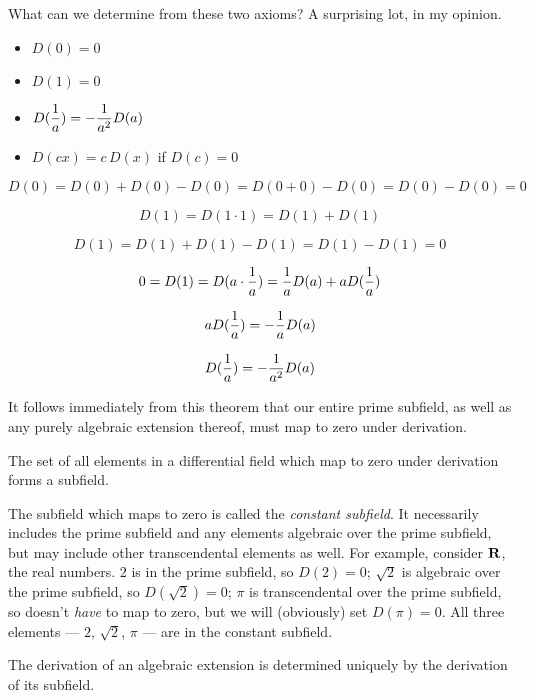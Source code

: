 What can we determine from these two axioms?  A surprising lot,
in my opinion.


\theorem\label{basic difalg}

\begin{itemize}
\item $D(0) = 0$
\item $D(1) = 0$
\item $\displaystyle{D({1\over a}) = - {1\over a^2}D(a)}$
\item $D(cx) = c\, D(x)$ if $D(c)=0$
\end{itemize}

\proof

$$D(0) = D(0) + D(0) - D(0) = D(0+0) - D(0) = D(0) - D(0) = 0$$

$$D(1) = D(1\cdot1) = D(1) + D(1)$$

$$D(1) = D(1) + D(1) - D(1) = D(1) - D(1) = 0$$

$$0 = D(1) = D(a\cdot{1\over a}) = {1\over a} D(a) + a D({1\over a})$$

$$ a D({1\over a}) = - {1\over a}D(a)$$

$$ D({1\over a}) = - {1\over a^2}D(a)$$

\endtheorem

It follows immediately from this theorem that our entire prime
subfield, as well as any purely algebraic extension thereof, must map
to zero under derivation.

\theorem

The set of all elements in a differential field which map to zero
under derivation forms a subfield.

\endtheorem

The subfield which maps to zero is called the {\it constant subfield}.
It necessarily includes the prime subfield and any elements algebraic
over the prime subfield, but may include other transcendental elements
as well.  For example, consider ${\bf R}$, the real numbers.  $2$ is
in the prime subfield, so $D(2)=0$; $\sqrt{2}$ is algebraic over the
prime subfield, so $D({\sqrt 2})=0$; $\pi$ is transcendental over the
prime subfield, so doesn't {\it have} to map to zero, but we will
(obviously) set $D(\pi)=0$.  All three elements --- $2$, ${\sqrt 2}$,
$\pi$ --- are in the constant subfield.

\theorem
\label{derivation of an algebraic element}

The derivation of an algebraic extension
is determined uniquely by the derivation of its subfield.

